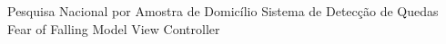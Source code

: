 \begin{acronym}[ACRONYM] 

 { Pesquisa Nacional por Amostra de Domicílio }
 {Sistema de Detecção de Quedas}
 {Fear of Falling}
 { Model View Controller }
    
\end{acronym}